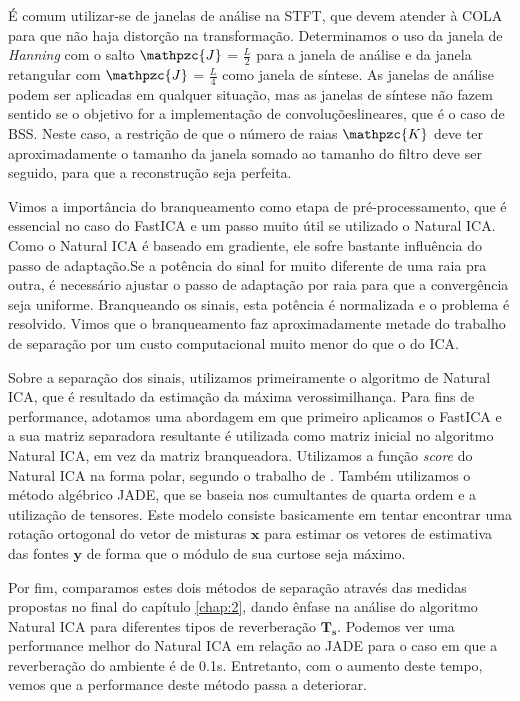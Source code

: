 É comum utilizar-se de janelas de análise na STFT, que devem atender à COLA para que não haja distorção na transformação. Determinamos o uso da janela de \textit{Hanning} com o salto $\mathpzc{J}$ = $\frac{L}{2}$ para a janela de análise e da janela retangular com  $\mathpzc{J}$ = $\frac{L}{4}$ como janela de síntese. As janelas de análise podem ser aplicadas em qualquer situação, mas as janelas de síntese não fazem sentido se o objetivo for a implementação de convoluçõeslineares, que é o caso de BSS. Neste caso, a restrição de que o número de raias $\mathpzc{K}$ deve ter aproximadamente o tamanho da janela somado ao tamanho do filtro deve ser seguido, para que a reconstrução seja perfeita. 

Vimos a importância do branqueamento como etapa de pré-processamento, que é essencial no caso do FastICA e um passo muito útil se utilizado o Natural ICA. Como o Natural ICA é baseado em gradiente, ele sofre bastante influência do passo de adaptação.Se a potência do sinal for muito diferente de uma raia pra outra, é necessário ajustar o passo de adaptação por raia para que a convergência seja uniforme. Branqueando os sinais, esta potência é normalizada e o problema é resolvido. Vimos que o branqueamento faz aproximadamente metade do trabalho de separação por um custo computacional muito menor do que o do ICA.
 
Sobre a separação dos sinais, utilizamos primeiramente o algoritmo de Natural ICA, que é resultado da estimação da máxima verossimilhança. Para fins de performance, adotamos uma abordagem em que primeiro aplicamos o FastICA e a sua matriz separadora resultante é utilizada como matriz inicial no algoritmo Natural ICA, em vez da matriz branqueadora. Utilizamos a função \textit{score} do Natural ICA na forma polar, segundo o trabalho de \cite{LuizVictorio}. Também utilizamos o método algébrico JADE, que se baseia nos cumultantes de quarta ordem e a utilização de tensores. Este modelo consiste basicamente em tentar encontrar uma rotação ortogonal do vetor de misturas $\mathbf{x}$ para estimar os vetores de estimativa das fontes $\mathbf{y}$ de forma que o módulo de sua curtose seja máximo.

Por fim, comparamos estes dois métodos de separação através das medidas propostas no final do capítulo \ref{chap:2}, dando ênfase na análise do algoritmo Natural ICA para diferentes tipos de reverberação $\mathbf{T_s}$. Podemos ver uma performance melhor do Natural ICA em relação ao JADE para o caso em que a reverberação do ambiente é de 0.1s. Entretanto, com o aumento deste tempo, vemos que a performance deste método passa a deteriorar.

